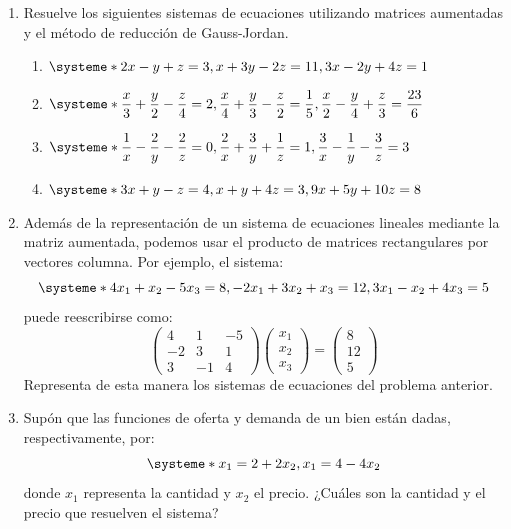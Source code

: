 \documentclass[8pt,a4paper]{article}
\begin{document}
\begin{enumerate}
		\item Resuelve los siguientes sistemas de ecuaciones utilizando matrices aumentadas y el método de reducción de Gauss-Jordan.
		
			\begin{multicols}{2}
				\begin{enumerate}
					\item $\displaystyle \systeme*{2x-y+z=3, x+3y-2z=11, 3x-2y+4z=1}$
					\item $\displaystyle \systeme*{\frac{x}{3}+\frac{y}{2}-\frac{z}{4}=2,
							\frac{x}{4}+\frac{y}{3}-\frac{z}{2}=\frac{1}{5},
							\frac{x}{2}-\frac{y}{4}+\frac{z}{3}=\frac{23}{6}}$
					\item $\displaystyle \systeme*{\frac{1}{x}-\frac{2}{y}-\frac{2}{z}=0,
							\frac{2}{x}+\frac{3}{y}+\frac{1}{z}=1,
							\frac{3}{x}-\frac{1}{y}-\frac{3}{z}=3}$
					\item $\displaystyle \systeme*{3x+y-z=4,x+y+4z=3,9x+5y+10z=8}$
				\end{enumerate}
			\end{multicols}
			
		\item Además de la representación de un sistema de ecuaciones lineales mediante la matriz aumentada, podemos usar el producto de matrices rectangulares por vectores columna. Por ejemplo, el sistema:
%		
			\[\systeme*{4x_1+x_2-5x_3=8,-2x_1+3x_2+x_3=12,3x_1-x_2+4x_3=5}\]
%
puede reescribirse como:
%
			\[\begin{pmatrix}
				4 & 1 & -5 \\
				-2 & 3 & 1 \\
				3 & -1 & 4
				\end{pmatrix}\begin{pmatrix}x_1\\x_2\\x_3\end{pmatrix}=\begin{pmatrix}8\\12\\5\end{pmatrix}\]
%
Representa de esta manera los sistemas de ecuaciones del problema anterior.

		\item Supón que las funciones de oferta y demanda de un bien están dadas, respectivamente, por:
%
			\[\systeme*{x_1=2+2x_2,x_1=4-4x_2}\]
%
donde $x_1$ representa la cantidad y $x_2$ el precio. ¿Cuáles son la cantidad y el precio que resuelven el sistema?


\end{enumerate}
\end{document}

